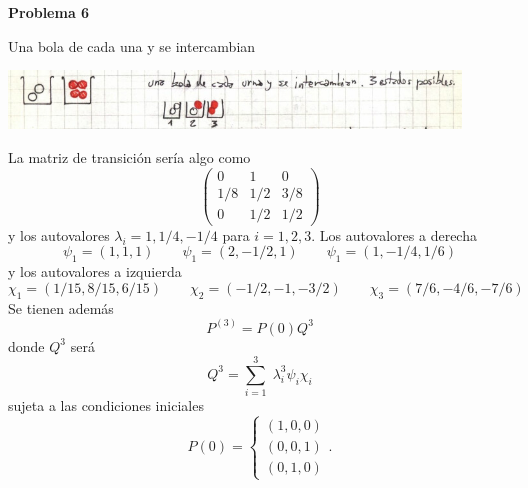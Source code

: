 \documentclass[10pt,oneside]{CBFT_book}
\begin{document}
\begin{ejemplo}{\bf Problema 6}

Una bola de cada una y se intercambian

\includegraphics[width=0.90\textwidth]{images/1606329219.jpg}

La matriz de transición sería algo como
\[
	\begin{pmatrix}
	 0 	&	1	&	0	\\
	 1/8 	&	1/2	&	3/8	\\
	 0 	&	1/2	&	1/2	
	\end{pmatrix}
\]
y los autovalores $\lambda_i = 1, 1/4, -1/4$ para $i=1,2,3$.
Los autovalores a derecha
\[
	\psi_1 = (1,1,1) \qquad 
	\psi_1 = (2,-1/2,1) \qquad 
	\psi_1 = (1,-1/4,1/6) 
\]
y los autovalores a izquierda
\[
	\chi_1 = ( 1/15, 8/15, 6/15 ) \qquad
	\chi_2 = ( -1/2, -1, -3/2 ) \qquad 
	\chi_3 = ( 7/6, -4/6, -7/6 ) 
\]
Se tienen además
\[
	P^{(3)} = P(0) Q^3
\]
donde $Q^3$ será
\[
	Q^3 = \sum_{i=1}^3 \; \lambda_i^3  \psi_i \chi_i
\]
sujeta a las condiciones iniciales
\[
	P(0) = \begin{cases}
	 (1,0,0) \\
	 (0,0,1) \\
	 (0,1,0)
	\end{cases}.
\]


\end{ejemplo}
\end{document}
